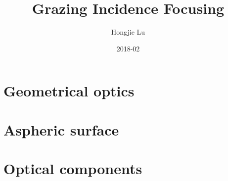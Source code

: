 \documentclass{article}
\title{Grazing Incidence Focusing}
\date{2018-02}
\author{Hongjie Lu}
\begin{document}
	\maketitle
	\newpage
	\tableofcontents
	\newpage
	\section{Geometrical optics}
	{\let\section\subsection
	\let\subsection\subsubsection
	
	}
	
	\newpage
	\section{Aspheric surface}
	{\let\section\subsection
	\let\subsection\subsubsection
	
	}
	
	\newpage
	\section{Optical components}
	{\let\section\subsection
	\let\subsection\subsubsection
	
	}
	
\end{document}
